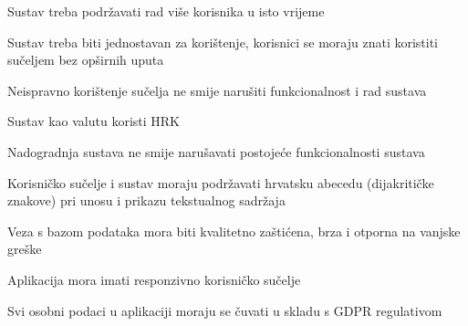 			\begin{packed_item}
				\item Sustav treba podržavati rad više korisnika u isto vrijeme
				\item Sustav treba biti jednostavan za korištenje, korisnici se moraju znati koristiti sučeljem bez opširnih uputa
				\item Neispravno korištenje sučelja ne smije narušiti funkcionalnost i rad sustava
				\item Sustav kao valutu koristi HRK
				\item Nadogradnja sustava ne smije narušavati postojeće funkcionalnosti sustava
				\item Korisničko sučelje i sustav moraju podržavati hrvatsku abecedu (dijakritičke znakove) pri unosu i prikazu tekstualnog sadržaja
				\item Veza s bazom podataka mora biti kvalitetno zaštićena, brza i otporna na vanjske greške
				\item Aplikacija mora imati responzivno korisničko sučelje
				\item Svi osobni podaci u aplikaciji moraju se čuvati u skladu s GDPR regulativom
			\end{packed_item}
			 
			 
			 
	